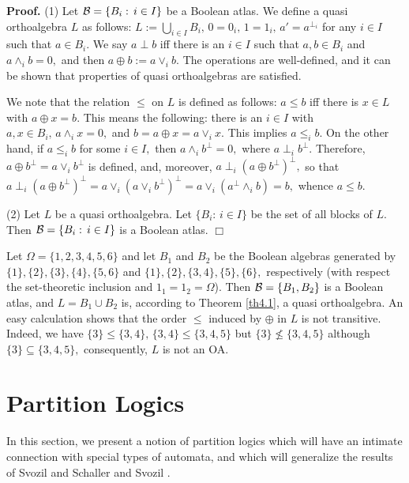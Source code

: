 {\bf Proof.} (1) Let ${\cal {B}} = \{B_i:\, i \in I\}$ be a Boolean
atlas. We define a quasi orthoalgebra $L$ as follows: $L := \bigcup_{i \in I} B_i,\,
0 = 0_i,\, 1 = 1_i,\, a' = a^{\bot_i}$ for any $i\in I$ such that
$a \in B_i.$ We say $a \perp b$ iff there is an $i \in I$ such that $a, b \in B_i$
and $a \wedge_i b = 0,$ and then $a \oplus b := a \vee_i b.$ The operations
are well-defined, and it can be shown that properties of quasi orthoalgebras
are satisfied.

We note that the relation $\le$ on $L$ is defined as follows:
$a \le b $ iff there is $x \in L$ with $ a \oplus x = b.$ This means the
following: there is an $i \in I$ with $a,x \in B_i,\, a \wedge_i x = 0,$
and $b = a \oplus x = a \vee_i x.$ This implies $a \le_i b.$ On the other hand,
if $a \le_i b$ for some $i \in I,$ then $a \wedge_i b^\bot = 0,$ where
$a \perp_i b^\bot.$ Therefore, $a \oplus b^\bot = a \vee_i b^\bot$ is defined, and,
moreover, $a \perp_i (a \oplus b^\bot)^\bot,$ so that $a \perp_i (a \oplus b^\bot)^\bot
= a \vee_i (a \vee_i b^\bot)^\bot = a \vee_i (a^\bot\wedge_i b) =b,$ whence $ a \le b.$

(2) Let $L$ be a quasi orthoalgebra. Let $ \{B_i:\, i \in I\}$ be
the set of all blocks of $L.$ Then ${\cal {B}} = \{B_i:\, i \in I\}$
is a Boolean atlas. \hfill $\Box$

\begin{example} Let $\Omega = \{1,2,3,4,5,6\}$ and let $B_1$ and $B_2$ be
 the Boolean algebras generated by $\{1\},$$ \{2\},$$ \{3\},$$
\{4\},$$
\{5,6\}$ and $\{1\},$$ \{2\},$$ \{3,4\},$$ \{5\},$$ \{6\},$ respectively
(with respect
the set-theoretic inclusion and $1_1 = 1_2= \Omega$). Then ${\cal {B}}
= \{B_1, B_2\}$ is a Boolean atlas, and $L = B_1 \cup B_2$ is,
according to Theorem {\rm \ref{th4.1}}, a quasi orthoalgebra. An easy
calculation shows that the order $\le $ induced by $\oplus$ in $L$
is not transitive. Indeed, we have $\{3\} \le \{3,4\},\, \{3,4\} \le
\{3,4,5\}$ but $\{3\} \not\le \{3,4,5\}$ although $\{3\} \subseteq \{3,4,5\},$
consequently, $L$ is not an OA.
\end{example}

\section{Partition Logics}%

In this section, we present a notion of partition logics which
will have an intimate connection with special types of automata,
and which will generalize the results of Svozil
\cite{Svo}
and
 Schaller and Svozil
\cite{ScSv1, ScSv2, ScSv3}.

